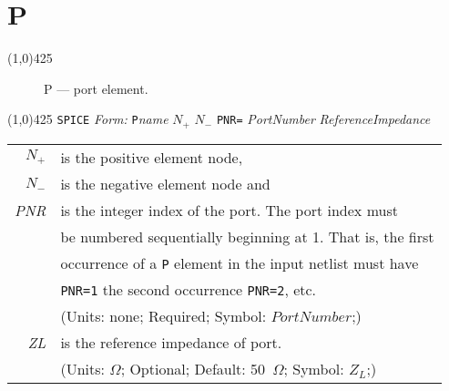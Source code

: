 \oddsidemargin 10mm \topmargin 0.0in \textwidth 5.5in \textheight
7.375in \evensidemargin 1.0in \headheight 0.18in \footskip 0.16in
\section[P \- Port Element]{
\hspace{70mm}\huge\textbf{P}}
\linethickness{1mm}\line(1,0){425} \normalsize
\begin{figure}[h]
\centerline{\epsfxsize=1.5in} \caption{P --- port
element.\label{fig:port}}
\end{figure}
\newline
\linethickness{0.5mm} \line(1,0){425}
\newline
\texttt{SPICE} \textit{Form:}
\newline
{\tt P}{\it name} $N_{+}$ $N_{-}$ {\tt PNR=} {\it PortNumber}
       {\it ReferenceImpedance}\E
\newline
\newline
\begin{tabular}{r l}
$N_{+}$ & is the positive element node,\\
$N_{-}$ & is the negative element node and \\
{\it PNR} & is the integer index of the port. The port index
must\\
& be numbered sequentially beginning at 1. That is, the first\\
& occurrence of a {\tt P} element in the input netlist must
have\\
& {\tt PNR=1} the second occurrence {\tt PNR=2}, etc.\\
             & (Units: none; Required; Symbol: $PortNumber$;)\\
{\it ZL} & is the reference impedance of port.\\
              & (Units: $\Omega$; Optional; Default: 50~$\Omega$; Symbol: $Z_L$;)\\
\end{tabular}
